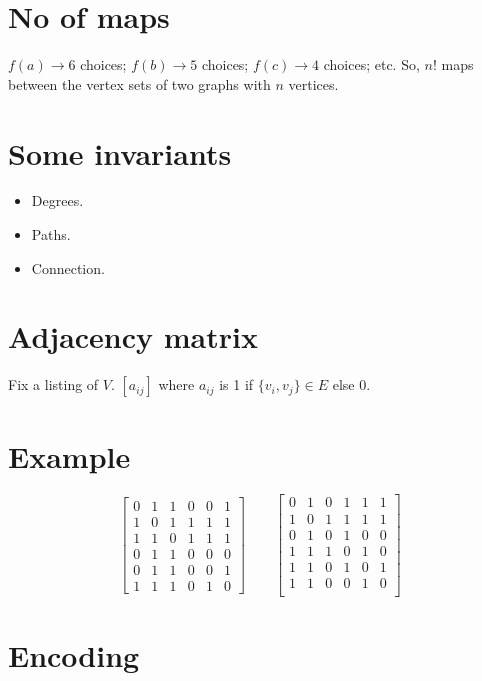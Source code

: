\documentclass{notes}
\begin{document}
  \section*{No of maps}
    \(f(a) \rightarrow 6\) choices; \(f(b) \rightarrow 5\) choices; \(f(c) \rightarrow 4\) choices; etc.
    So, \(n!\) maps between the vertex sets of two graphs with \(n\) vertices.
  
  \section*{Some invariants}
    \begin{itemize}
      \item Degrees.
      \item Paths.
      \item Connection.
    \end{itemize}

  \section*{Adjacency matrix}
    Fix a listing of \(V\).
    \([a_{ij}]\) where \(a_{ij}\) is 1 if \(\{v_i,v_j\} \in E \) else 0.
  
  \section*{Example}
  \[
    \begin{bmatrix}
      0 & 1 & 1 & 0 & 0 & 1 \\
      1 & 0 & 1 & 1 & 1 & 1 \\
      1 & 1 & 0 & 1 & 1 & 1 \\
      0 & 1 & 1 & 0 & 0 & 0 \\
      0 & 1 & 1 & 0 & 0 & 1 \\
      1 & 1 & 1 & 0 & 1 & 0 
    \end{bmatrix}
    \qquad
    \begin{bmatrix}
      0 & 1 & 0 & 1 & 1 & 1 \\
      1 & 0 & 1 & 1 & 1 & 1 \\
      0 & 1 & 0 & 1 & 0 & 0 \\
      1 & 1 & 1 & 0 & 1 & 0 \\
      1 & 1 & 0 & 1 & 0 & 1 \\
      1 & 1 & 0 & 0 & 1 & 0 \\
    \end{bmatrix}
  \]
  \section*{Encoding}

\end{document}
